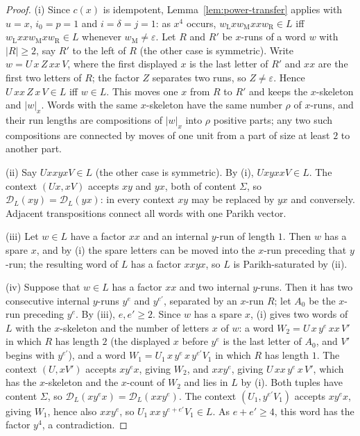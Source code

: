 \documentclass[11pt]{article}
\numberwithin{equation}{section}
\theoremstyle{plain}
\theoremstyle{definition}
\theoremstyle{remark}
\newcommand{\D}{\mathcal{D}}
\newcommand{\eps}{\varepsilon}
\theoremstyle{plain}
\begin{document}
\begin{proof}
(i) Since $c(x)$ is idempotent, Lemma~\ref{lem:power-transfer} applies with
$u=x$, $i_0=p=1$ and $i=\delta=j=1$: as $x^4$ occurs, $w_{\mathrm L}xw_{\mathrm M}xxw_{\mathrm R}\in L$ iff
$w_{\mathrm L}xxw_{\mathrm M}xw_{\mathrm R}\in L$ whenever $w_{\mathrm M}\ne\eps$.  Let $R$ and $R'$ be $x$-runs of a word $w$ with
$|R|\ge2$, say $R'$ to the left of $R$ (the other case is symmetric).  Write
$w=U\,x\,Z\,xx\,V$, where the first displayed $x$ is the last letter of $R'$ and
$xx$ are the first two letters of $R$; the factor $Z$ separates two runs, so
$Z\ne\eps$.  Hence $U\,xx\,Z\,x\,V\in L$ iff $w\in L$.  This moves one $x$ from $R$
to $R'$ and keeps the $x$-skeleton and $|w|_x$.  Words with the same
$x$-skeleton have the same number $\rho$ of $x$-runs, and their run lengths are
compositions of $|w|_x$ into $\rho$ positive parts; any two such compositions
are connected by moves of one unit from a part of size at least $2$ to another
part.

(ii) Say $UxxyxV\in L$ (the other case is symmetric).  By (i),
$UxyxxV\in L$.  The context $(Ux,xV)$ accepts $xy$ and $yx$, both of content
$\Sigma$, so $\D_L(xy)=\D_L(yx)$: in every context $xy$ may be replaced by $yx$
and conversely.  Adjacent transpositions connect all words with one Parikh
vector.

(iii) Let $w\in L$ have a factor $xx$ and an internal $y$-run of length $1$.
Then $w$ has a spare $x$, and by (i) the spare letters can be moved into the
$x$-run preceding that $y$-run; the resulting word of $L$ has a factor $xxyx$,
so $L$ is Parikh-saturated by (ii).

(iv) Suppose that $w\in L$ has a factor $xx$ and two internal $y$-runs.  Then it
has two consecutive internal $y$-runs $y^e$ and $y^{e'}$, separated by an
$x$-run $R$; let $A_0$ be the $x$-run preceding $y^e$.  By (iii), $e,e'\ge2$.
Since $w$ has a spare $x$, (i) gives two words of $L$ with the $x$-skeleton and
the number of letters $x$ of $w$: a word $W_2=U\,x\,y^e\,xx\,V'$ in which $R$ has
length $2$ (the displayed $x$ before $y^e$ is the last letter of $A_0$, and $V'$
begins with $y^{e'}$), and a word $W_1=U_1\,x\,y^e\,x\,y^{e'}V_1$ in which $R$ has
length $1$.  The context $(U,xV')$ accepts $xy^ex$, giving $W_2$, and $xxy^e$,
giving $U\,xx\,y^e\,x\,V'$, which has the $x$-skeleton and the $x$-count of $W_2$
and lies in $L$ by (i).  Both tuples have content $\Sigma$, so
$\D_L(xy^ex)=\D_L(xxy^e)$.  The context $(U_1,y^{e'}V_1)$ accepts $xy^ex$, giving
$W_1$, hence also $xxy^e$, so $U_1\,xx\,y^{e+e'}V_1\in L$.  As $e+e'\ge4$, this
word has the factor $y^4$, a contradiction.
\end{proof}
\end{document}
